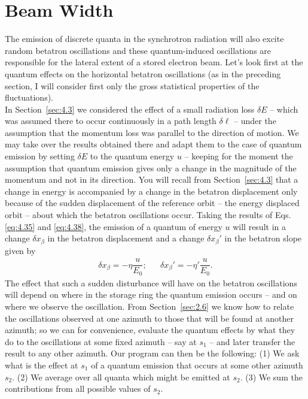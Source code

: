 \documentclass[../sands-adaptation.tex]{subfiles}
\begin{document}
\section{Beam Width} \label{sec:5.5}

The emission of discrete quanta in the synchrotron radiation will also excite random betatron oscillations and these quantum-induced oscillations are responsible for the lateral extent of a stored electron beam. Let's look first at the quantum effects on the horizontal betatron oscillations (as in the preceding section, I will consider first only the gross statistical
 properties of the fluctuations).\\
In Section~\ref{sec:4.3} we considered the effect of a small radiation loss $\delta E$ -- which
was assumed there to occur continuously in a path length $\delta \ell$ -- under the assumption that the momentum loss was parallel to the direction of motion. We may take over the results obtained there and adapt them to the case of quantum emission by setting $\delta E$ to the quantum
 energy $u$ -- keeping for the moment the assumption that quantum emission gives only a change in the magnitude of the momentum and not in its direction. You will recall from Section~\ref{sec:4.3} that a change in energy is accompanied by a change in the betatron displacement only because of the sudden displacement of the reference orbit -- the energy displaced orbit -- about which
the betatron oscillations occur. Taking the results of Eqs. \eqref{eq:4.35} and \eqref{eq:4.38},
 the emission of a quantum of energy $u$ will result in a change $\delta x_\beta$ in the betatron displacement and a change $\delta x_\beta'$ in the betatron slope given by
\begin{align}\label{eq:5.67}
	\delta x_\beta = -\eta \dfrac{u}{E_0}; && \delta x_\beta' = -\eta' \dfrac{u}{E_0}.
\end{align}
The effect that such a sudden disturbance will have on the betatron oscillations will depend on where in the storage ring the quantum emission occurs -- and on where we observe the oscillation.
 From Section~\ref{sec:2.6} we know how to relate the oscillations observed at one azimuth to those that will be found at another azimuth; so we can for convenience, evaluate the quantum effects by what they do to the oscillations at some fixed azimuth -- say at $s_1$ -- and later transfer the result to any other azimuth. Our program can then be the following: (1) We ask what is
the effect at $s_1$ of a quantum emission that occurs at some other azimuth $s_2$. (2) We average over all quanta which might be emitted at $s_2$. (3) We sum the contributions from all possible values of $s_2$.\\
\end{document}
